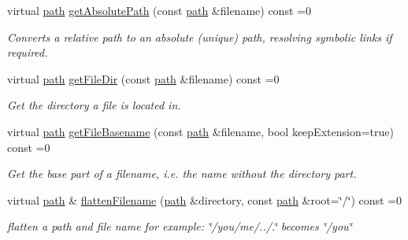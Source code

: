 \begin{DoxyCompactItemize}
virtual \hyperlink{namespaceirr_1_1io_ab1bdc45edb3f94d8319c02bc0f840ee1}{path} \hyperlink{classirr_1_1io_1_1IFileSystem_a77191d7917349a0200f5de3ef29acd18}{get\+Absolute\+Path} (const \hyperlink{namespaceirr_1_1io_ab1bdc45edb3f94d8319c02bc0f840ee1}{path} \&filename) const =0
\begin{DoxyCompactList}\small\item\em Converts a relative path to an absolute (unique) path, resolving symbolic links if required. \end{DoxyCompactList}\item 
virtual \hyperlink{namespaceirr_1_1io_ab1bdc45edb3f94d8319c02bc0f840ee1}{path} \hyperlink{classirr_1_1io_1_1IFileSystem_ad8b7b93f32f58c1ba9a8e7cacd5de80b}{get\+File\+Dir} (const \hyperlink{namespaceirr_1_1io_ab1bdc45edb3f94d8319c02bc0f840ee1}{path} \&filename) const =0
\begin{DoxyCompactList}\small\item\em Get the directory a file is located in. \end{DoxyCompactList}\item 
virtual \hyperlink{namespaceirr_1_1io_ab1bdc45edb3f94d8319c02bc0f840ee1}{path} \hyperlink{classirr_1_1io_1_1IFileSystem_a4235989e4ec21c78f1fd1ca861980c6c}{get\+File\+Basename} (const \hyperlink{namespaceirr_1_1io_ab1bdc45edb3f94d8319c02bc0f840ee1}{path} \&filename, bool keep\+Extension=true) const =0
\begin{DoxyCompactList}\small\item\em Get the base part of a filename, i.\+e. the name without the directory part. \end{DoxyCompactList}\item 
\mbox{\label{classirr_1_1io_1_1IFileSystem_aa76bbc9cc5ec7a8dbe96713f1ba20de6}} 
virtual \hyperlink{namespaceirr_1_1io_ab1bdc45edb3f94d8319c02bc0f840ee1}{path} \& \hyperlink{classirr_1_1io_1_1IFileSystem_aa76bbc9cc5ec7a8dbe96713f1ba20de6}{flatten\+Filename} (\hyperlink{namespaceirr_1_1io_ab1bdc45edb3f94d8319c02bc0f840ee1}{path} \&directory, const \hyperlink{namespaceirr_1_1io_ab1bdc45edb3f94d8319c02bc0f840ee1}{path} \&root=\char`\"{}/\char`\"{}) const =0
\begin{DoxyCompactList}\small\item\em flatten a path and file name for example\+: \char`\"{}/you/me/../.\char`\"{} becomes \char`\"{}/you\char`\"{} \end{DoxyCompactList}\item 

\end{DoxyCompactItemize}
